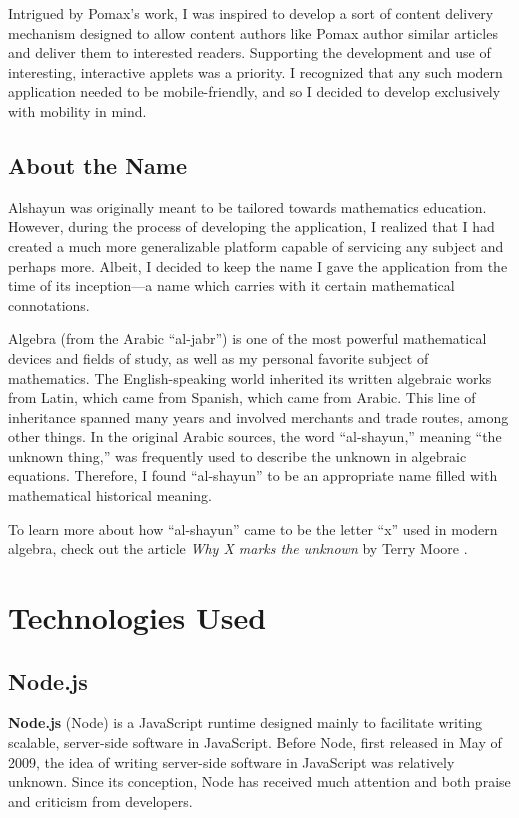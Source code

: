 \documentclass[12pt]{report}
\begin{document}
Intrigued by Pomax's work, I was inspired to develop a sort of content delivery
mechanism designed to allow content authors like Pomax author similar articles
and deliver them to interested readers. Supporting the development and use of
interesting, interactive applets was a priority. I recognized that any such
modern application needed to be mobile-friendly, and so I decided to develop
exclusively with mobility in mind.

    \section{About the Name}

Alshayun was originally meant to be tailored towards mathematics education.
However, during the process of developing the application, I realized that I had
created a much more generalizable platform capable of servicing any subject and
perhaps more. Albeit, I decided to keep the name I gave the application from the
time of its inception---a name which carries with it certain mathematical
connotations.

Algebra (from the Arabic ``al-jabr'') is one of the most powerful mathematical
devices and fields of study, as well as my personal favorite subject of
mathematics. The English-speaking world inherited its written algebraic works
from Latin, which came from Spanish, which came from Arabic. This line of
inheritance spanned many years and involved merchants and trade routes, among
other things. In the original Arabic sources, the word ``al-shayun,'' meaning
``the unknown thing,'' was frequently used to describe the unknown in algebraic
equations. Therefore, I found ``al-shayun'' to be an appropriate name filled
with mathematical historical meaning.

To learn more about how ``al-shayun'' came to be the letter ``x'' used in modern
algebra, check out the article \textit{Why X marks the unknown} by Terry Moore
\cite{moore}.

\chapter{Technologies Used}

    \section{Node.js}

\textbf{Node\@.js} (Node) \cite{nodejs} is a JavaScript runtime designed mainly
to facilitate writing scalable, server-side software in JavaScript. Before Node,
first released in May of 2009, the idea of writing server-side software in
JavaScript was relatively unknown. Since its conception, Node has received much
attention and both praise and criticism from developers.
\end{document}
